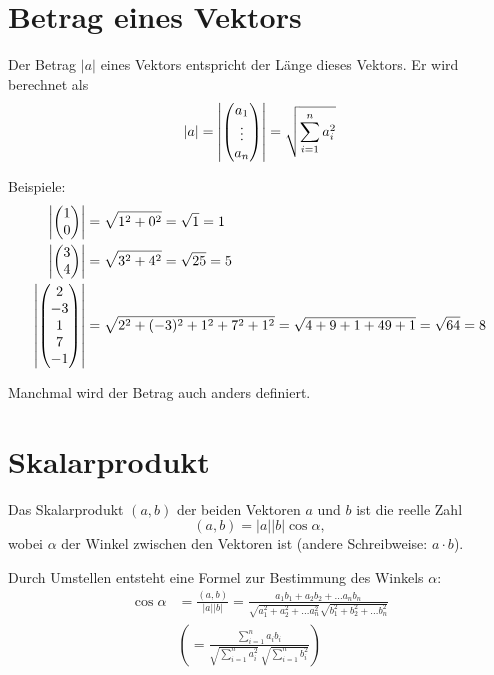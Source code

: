 	\section{Betrag eines Vektors}
		
		Der Betrag $|a|$ eines Vektors entspricht der Länge dieses Vektors. Er wird
		berechnet als \[|a| = \left| \left(\!\!\!\begin{array}{c}a_1\\ \vdots \\ a_n \end{array}\!\!\!\right) \right| =
		\sqrt{\sum_{i=1}^n a_i^2}\] 
		
		Beispiele:
		\begin{align*}
			\left| \mvect{1\\0}\right| &= \sqrt{1^2+0^2} = \sqrt{1} = 1\\
			\left| \mvect{3\\4}\right| &= \sqrt{3^2+4^2} = \sqrt{25} = 5\\
			\left|\mvect{2\\-3\\1\\7\\-1}\right| &= \sqrt{2^2+(-3)^2+1^2+7^2+1^2} =
			\sqrt{4+9+1+49+1} = \sqrt{64} = 8
		\end{align*}
        
        Manchmal wird der Betrag auch anders definiert.
		
	\section{Skalarprodukt}
		Das Skalarprodukt $(a,b)$  der beiden Vektoren $a$ und $b$
		ist die reelle Zahl \[(a,b) =|a||b|\cos\alpha,\] wobei $\alpha$ der Winkel
		zwischen den
		Vektoren ist (andere Schreibweise: $a\cdot b$).
		
		\noindent Durch Umstellen entsteht eine Formel zur Bestimmung des Winkels $\alpha$:
		\begin{align*}
\cos\alpha &= \frac{(a,b)}{|a| |b|} = \frac{a_1b_1+a_2b_2+\dots
		a_nb_n}{\sqrt{a_1^2+a_2^2+\dots a_n^2}\sqrt{b_1^2+b_2^2+\dots b_n^2}} \\&
		\left( = \frac{\sum_{i=1}^n a_ib_i}{\sqrt{\sum_{i=1}^n a_i^2}\ 
		\sqrt{\sum_{i=1}^n b_i^2} } \right)\end{align*}
		
